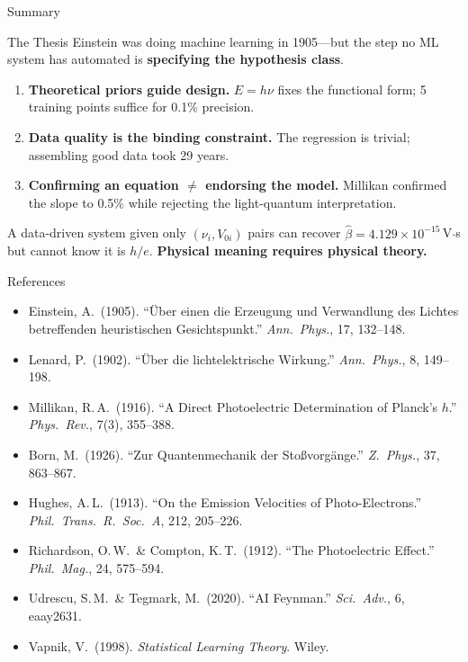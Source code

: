\documentclass[aspectratio=169]{beamer}
\begin{document}
\begin{frame}{Summary}

\begin{block}{The Thesis}
Einstein was doing machine learning in 1905---but the step no ML system
has automated is \textbf{specifying the hypothesis class}.
\end{block}

\bigskip
\begin{enumerate}
  \item \textbf{Theoretical priors guide design.} $E=h\nu$ fixes the
    functional form; 5 training points suffice for 0.1\% precision.
  \item \textbf{Data quality is the binding constraint.} The regression
    is trivial; assembling good data took 29 years.
  \item \textbf{Confirming an equation $\neq$ endorsing the model.}
    Millikan confirmed the slope to 0.5\% while rejecting the
    light-quantum interpretation.
\end{enumerate}

\bigskip
A data-driven system given only $(\nu_i, V_{0i})$ pairs can recover
$\hat\beta = 4.129\times10^{-15}$\,V$\cdot$s but cannot know it is $h/e$.
\textbf{Physical meaning requires physical theory.}

\end{frame}

\begin{frame}{References}

\small
\begin{itemize}
  \item Einstein, A.\ (1905). ``\"Uber einen die Erzeugung und Verwandlung
    des Lichtes betreffenden heuristischen Gesichtspunkt.''
    \textit{Ann.\ Phys.}, 17, 132--148.
  \item Lenard, P.\ (1902). ``\"Uber die lichtelektrische Wirkung.''
    \textit{Ann.\ Phys.}, 8, 149--198.
  \item Millikan, R.\,A.\ (1916). ``A Direct Photoelectric Determination
    of Planck's $h$.'' \textit{Phys.\ Rev.}, 7(3), 355--388.
  \item Born, M.\ (1926). ``Zur Quantenmechanik der
    Sto{\ss}vorg\"ange.'' \textit{Z.\ Phys.}, 37, 863--867.
  \item Hughes, A.\,L.\ (1913). ``On the Emission Velocities of
    Photo-Electrons.'' \textit{Phil.\ Trans.\ R.\ Soc.\ A}, 212, 205--226.
  \item Richardson, O.\,W.\ \& Compton, K.\,T.\ (1912). ``The
    Photoelectric Effect.'' \textit{Phil.\ Mag.}, 24, 575--594.
  \item Udrescu, S.\,M.\ \& Tegmark, M.\ (2020). ``AI Feynman.''
    \textit{Sci.\ Adv.}, 6, eaay2631.
  \item Vapnik, V.\ (1998). \textit{Statistical Learning Theory}.
    Wiley.
\end{itemize}

\end{frame}

\end{document}
